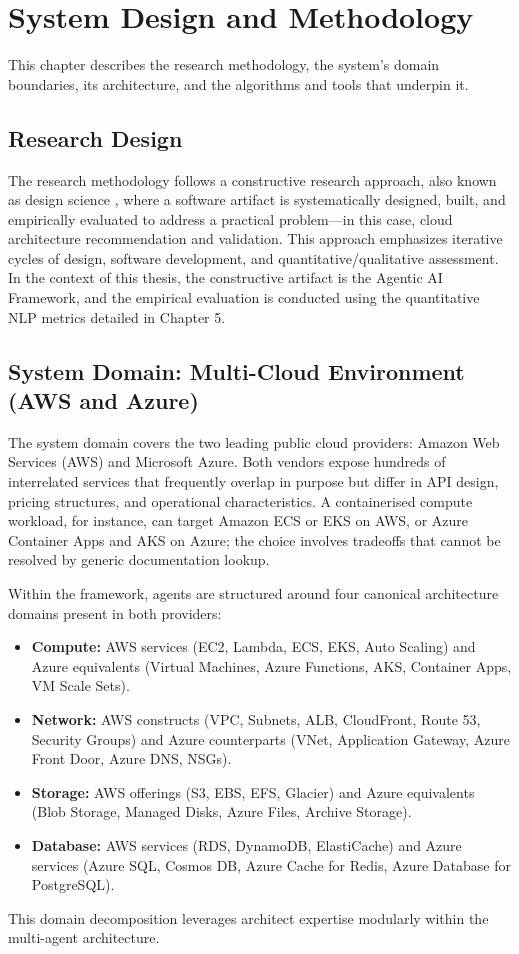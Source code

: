 \chapter{System Design and Methodology}

This chapter describes the research methodology, the system's domain boundaries, its architecture, and the algorithms and tools that underpin it.

\section{Research Design}

The research methodology follows a constructive research approach, also known as design science \cite{hevner2004design}, where a software artifact is systematically designed, built, and empirically evaluated to address a practical problem---in this case, cloud architecture recommendation and validation. This approach emphasizes iterative cycles of design, software development, and quantitative/qualitative assessment. In the context of this thesis, the constructive artifact is the Agentic AI Framework, and the empirical evaluation is conducted using the quantitative NLP metrics detailed in Chapter 5.

\section{System Domain: Multi-Cloud Environment (AWS and Azure)}

The system domain covers the two leading public cloud providers: Amazon Web Services (AWS) and Microsoft Azure. Both vendors expose hundreds of interrelated services that frequently overlap in purpose but differ in API design, pricing structures, and operational characteristics. A containerised compute workload, for instance, can target Amazon ECS or EKS on AWS, or Azure Container Apps and AKS on Azure; the choice involves tradeoffs that cannot be resolved by generic documentation lookup.

Within the framework, agents are structured around four canonical architecture domains present in both providers:

\begin{itemize}
    \item \textbf{Compute:} AWS services (EC2, Lambda, ECS, EKS, Auto Scaling) and Azure equivalents (Virtual Machines, Azure Functions, AKS, Container Apps, VM Scale Sets).
    \item \textbf{Network:} AWS constructs (VPC, Subnets, ALB, CloudFront, Route 53, Security Groups) and Azure counterparts (VNet, Application Gateway, Azure Front Door, Azure DNS, NSGs).
    \item \textbf{Storage:} AWS offerings (S3, EBS, EFS, Glacier) and Azure equivalents (Blob Storage, Managed Disks, Azure Files, Archive Storage).
    \item \textbf{Database:} AWS services (RDS, DynamoDB, ElastiCache) and Azure services (Azure SQL, Cosmos DB, Azure Cache for Redis, Azure Database for PostgreSQL).
\end{itemize}
This domain decomposition leverages architect expertise modularly within the multi-agent architecture.


